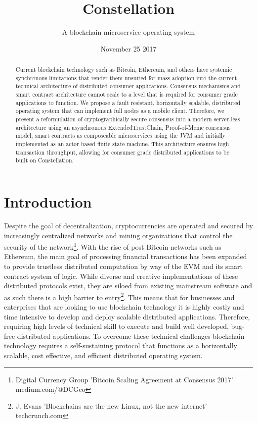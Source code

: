 \documentclass{article}
\title{Constellation}
\author{A blockchain microservice operating system}
\date{November 25 2017}
\begin{document}
\maketitle

\begin{abstract}
Current blockchain technology such as Bitcoin, Ethereum, and others have systemic synchronous limitations that render them unsuited for mass adoption into the current technical architecture of distributed consumer applications. Consensus mechanisms and smart contract architecture cannot scale to a level that is required for consumer grade applications to function. We propose a fault resistant, horizontally scalable, distributed operating system that can implement full nodes as a mobile client. Therefore, we present a reformulation of cryptographically secure consensus into a modern server-less architecture using an asynchronous ExtendedTrustChain, Proof-of-Meme consensus model,  smart contracts as composeable microservices using the JVM and initially implemented as an actor based finite state machine. This architecture ensures high transaction throughput, allowing for consumer grade distributed applications to be built on Constellation. \

\end{abstract}
\setcounter{secnumdepth}{0}
\section{Introduction}
Despite the goal of decentralization, cryptocurrencies are operated and secured by increasingly centralized networks and mining organizations that control the security of the network\footnote{Digital Currency Group 'Bitcoin Scaling Agreement at Consensus 2017' medium.com/@DCGco}. With the rise of post Bitcoin networks such as Ethereum, the main goal of processing financial transactions has been expanded to provide trustless distributed computation by way of the EVM and its smart contract system of logic. While diverse and creative implementations of these distributed protocols exist, they are siloed from existing mainstream software and as such there is a high barrier to entry\footnote{J. Evans 'Blockchains are the new Linux, not the new internet' techcrunch.com}. This means that for businesses and enterprises that are looking to use blockchain technology it is highly costly and time intensive to develop and deploy scalable distributed applications. Therefore, requiring high levels of technical skill to execute and build well developed, bug-free distributed applications. To overcome these technical challenges blockchain technology requires a self-sustaining protocol that functions as a horizontally scalable, cost effective, and efficient distributed operating system.
\end{document}
